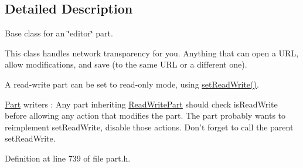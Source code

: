 \subsection{\-Detailed \-Description}
\-Base class for an \char`\"{}editor\char`\"{} part.

\-This class handles network transparency for you. \-Anything that can open a \-U\-R\-L, allow modifications, and save (to the same \-U\-R\-L or a different one).

\-A read-\/write part can be set to read-\/only mode, using \hyperlink{classKParts_1_1ReadWritePart_a5b8c2d4b35739c882dc67f0acf8096c2}{set\-Read\-Write()}.

\hyperlink{classKParts_1_1Part}{\-Part} writers \-: \-Any part inheriting \hyperlink{classKParts_1_1ReadWritePart}{\-Read\-Write\-Part} should check is\-Read\-Write before allowing any action that modifies the part. \-The part probably wants to reimplement set\-Read\-Write, disable those actions. \-Don't forget to call the parent set\-Read\-Write. 

\-Definition at line 739 of file part.\-h.



